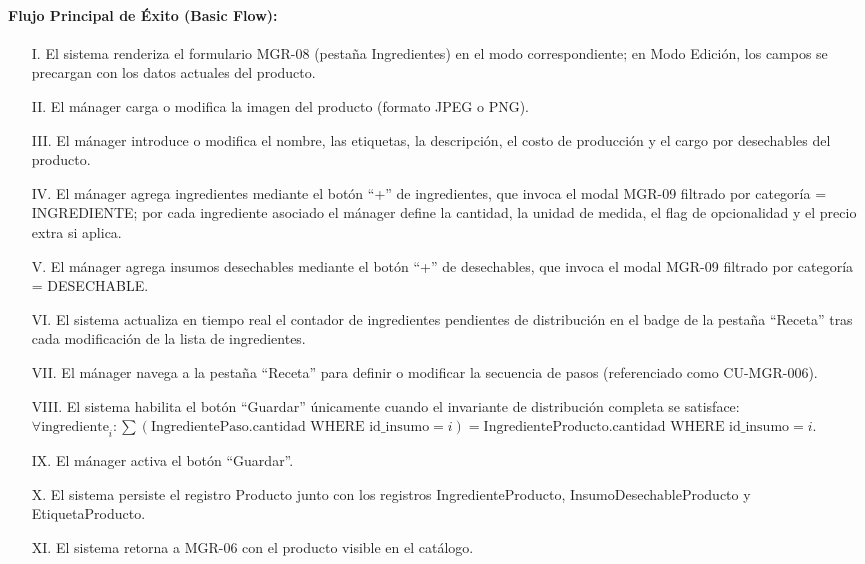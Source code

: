 \paragraph{Flujo Principal de Éxito (Basic Flow):}
\begin{enumerate}
    \item[I.] El sistema renderiza el formulario MGR-08 (pestaña Ingredientes) en el modo correspondiente; en Modo Edición, los campos se precargan con los datos actuales del producto.
    \item[II.] El mánager carga o modifica la imagen del producto (formato JPEG o PNG).
    \item[III.] El mánager introduce o modifica el nombre, las etiquetas, la descripción, el costo de producción y el cargo por desechables del producto.
    \item[IV.] El mánager agrega ingredientes mediante el botón ``+'' de ingredientes, que invoca el modal MGR-09 filtrado por categoría = INGREDIENTE; por cada ingrediente asociado el mánager define la cantidad, la unidad de medida, el flag de opcionalidad y el precio extra si aplica.
    \item[V.] El mánager agrega insumos desechables mediante el botón ``+'' de desechables, que invoca el modal MGR-09 filtrado por categoría = DESECHABLE.
    \item[VI.] El sistema actualiza en tiempo real el contador de ingredientes pendientes de distribución en el badge de la pestaña ``Receta'' tras cada modificación de la lista de ingredientes.
    \item[VII.] El mánager navega a la pestaña ``Receta'' para definir o modificar la secuencia de pasos (referenciado como CU-MGR-006).
    \item[VIII.] El sistema habilita el botón ``Guardar'' únicamente cuando el invariante de distribución completa se satisface: $\forall \text{ingrediente}_i : \sum (\text{IngredientePaso.cantidad WHERE id\_insumo} = i) = \text{IngredienteProducto.cantidad WHERE id\_insumo} = i$.
    \item[IX.] El mánager activa el botón ``Guardar''.
    \item[X.] El sistema persiste el registro Producto junto con los registros IngredienteProducto, InsumoDesechableProducto y EtiquetaProducto.
    \item[XI.] El sistema retorna a MGR-06 con el producto visible en el catálogo.
\end{enumerate}

